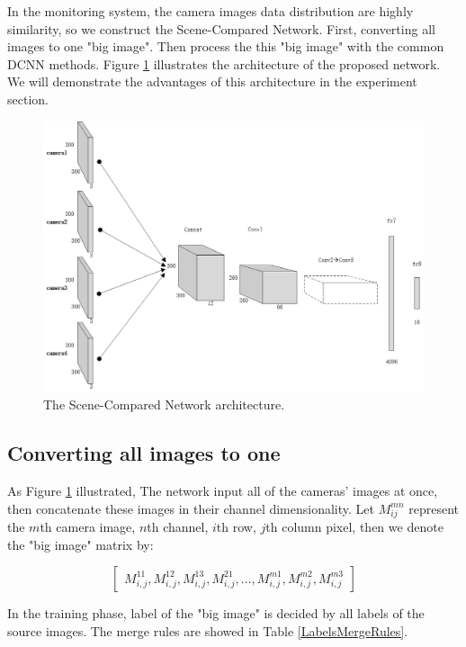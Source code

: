 \documentclass[sensors,article,submit,moreauthors,pdftex,10pt,a4paper]{mdpi}
\begin{document}
In the monitoring system, the camera images data distribution are highly similarity, so we construct the Scene-Compared Network. First, converting all images to one "big image". Then process the this "big image" with the common DCNN methods. Figure \ref{Scene-ComparedNet} illustrates the architecture of the proposed network. We will demonstrate the advantages of this architecture in the experiment section. 
\begin{figure}[H]
	\centering
	\includegraphics[width=15 cm]{3.jpg}
	\caption{The Scene-Compared Network architecture.}
	\label{Scene-ComparedNet}
\end{figure}

\subsection{Converting all images to one}

As Figure \ref{Scene-ComparedNet} illustrated, The network input all of the cameras' images at once, then concatenate these images in their channel dimensionality. Let $M_{ij}^{mn}$ represent the $m$th camera image, $n$th channel, $i$th row, $j$th column pixel, then we denote the "big image" matrix by:

\begin{equation}
\begin{bmatrix}
M_{i,j}^{11},M_{i,j}^{12},M_{i,j}^{13},M_{i,j}^{21},...,M_{i,j}^{m1},M_{i,j}^{m2},M_{i,j}^{m3}
\end{bmatrix}
\end{equation}

In the training phase, label of the "big image" is decided by all labels of the source images. The merge rules are showed in Table \ref{LabelsMergeRules}.
\end{document}
